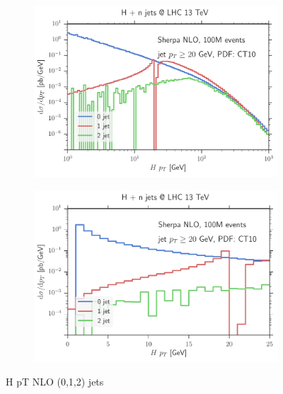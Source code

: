 %
\begin{figure}
\centering
\begin{subfigure}[]{0.49\textwidth}
	\includegraphics[width=\textwidth]{images/cmp100m_nlo_hpt.pdf}
\end{subfigure}
\hfill
\begin{subfigure}[]{0.49\textwidth}
	\includegraphics[width=\textwidth]{images/cmp100m_nlo_hptpeak.pdf}
\end{subfigure}
\caption{H pT NLO (0,1,2) jets}
\end{figure}
%
